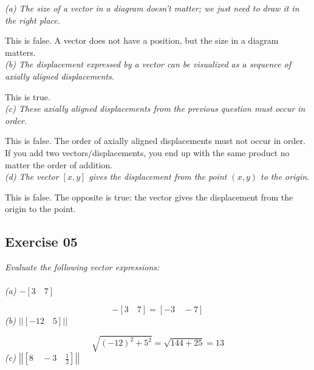\documentclass[12pt, a4paper]{article}
\begin{document}
\textit
{
	(a) The size of a vector in a diagram doesn't matter; we just need
	to draw it in the right place.\\
}

This is false. A vector does not have a position, but the size in a diagram matters.\\

\textit
{
	(b) The displacement expressed by a vector can be visualized as a
	sequence of axially aligned displacements.\\
}

This is true.\\

\textit
{
	(c) These axially aligned displacements from the previous question
	must occur in order.\\
}

This is false. The order of axially aligned displacements must not occur in order. If you add two vectors/displacements, you end up with the same product no matter the order of addition.\\

\textit
{
	 (d) The vector $[x, y]$ gives the displacement from the point $(x,
	 y)$ to the origin.\\
}

This is false. The opposite is true: the vector gives the displacement from the origin to the point.\\

\newpage\quad

\subsection*{Exercise 05}

\textit
{
	Evaluate the following vector expressions:\\
}
\textbf{}\\
\textit
{
	(a) \quad $-[3 \quad 7]$\\
}

\begin{equation}
	\tag*{}
	-[3 \quad 7] = [-3 \quad -7]
\end{equation}
\textit
{
	(b) \quad $\left|\left|\left[ -12 \quad 5 \right]\right|\right|$\\
}

\begin{equation}
	\tag*{}
	\sqrt{\left(-12\right)^2 + 5^2} = \sqrt{144 + 25} = 13
\end{equation}
\textit
{
	(c) \quad $\left|\left| \left[ 8 \quad -3 \quad \frac{1}{2} \right]
	\right|\right|$
}
\end{document}
